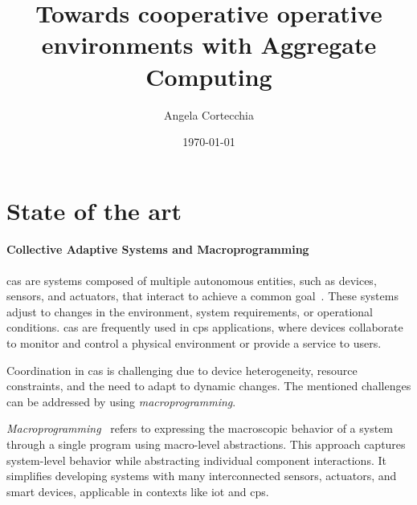 \documentclass[12pt, a4paper]{article}
\begin{document}
\title{Towards cooperative operative environments with Aggregate Computing}
\author{Angela Cortecchia}
\date{\today}
\maketitle
%

\section{State of the art}\label{sec:state-of-the-art}

\paragraph{Collective Adaptive Systems and Macroprogramming}

\ac{cas} are systems composed of multiple autonomous entities, such as devices, sensors, and actuators,
that interact to achieve a common goal~\cite{ferscha2015}.
%
These systems adjust to changes in the environment, system requirements, or operational conditions.
%
\ac{cas} are frequently used in \ac{cps} applications,
where devices collaborate to monitor and control a physical environment or provide a service to users.

Coordination in \ac{cas} is challenging due to device heterogeneity, resource constraints, and the need to adapt to dynamic changes.
%
The mentioned challenges can be addressed by using \emph{macroprogramming}.

\emph{Macroprogramming}~\cite{casadei2023} refers to expressing the macroscopic behavior of a system through a single program using
macro-level abstractions.
%
This approach captures system-level behavior while abstracting individual component interactions.
%
It simplifies developing systems with many interconnected sensors, actuators, and smart devices,
applicable in contexts like \ac{iot} and \ac{cps}.
\end{document}
